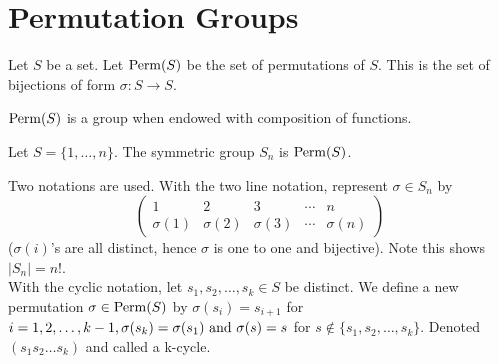 \section{Permutation Groups}

\begin{definition}[Permutations]
    Let \(S\) be a set. Let \(\operatorname{Perm}(S)\) be the set of permutations of \(S\). This is the set of bijections of form \(\sigma: S \to S\).
\end{definition}

\begin{proposition}
    \(\operatorname{Perm}(S)\) is a group when endowed with composition of functions.
\end{proposition}

\begin{definition}
    Let \(S = \{1, \dots, n\}\). The symmetric group \(S_n\) is \(\operatorname{Perm}(S)\).
\end{definition}

Two notations are used. With the two line notation, represent \(\sigma \in S_n\) by
\[\begin{pmatrix}
        1         & 2         & 3         & \cdots & n         \\
        \sigma(1) & \sigma(2) & \sigma(3) & \cdots & \sigma(n)
    \end{pmatrix}\]
(\(\sigma(i)\)'s are all distinct, hence \(\sigma\) is one to one and bijective). Note this shows \(|S_n| = n!\). \\

With the cyclic notation, let \(s_1, s_2, \dots, s_k \in S\) be distinct. We define a new permutation \(\sigma \in \operatorname{Perm}(S)\) by \(\sigma(s_i) = s_{i + 1}\) for \(i = 1, 2, \dots, k - 1, \sigma(s_k) = \sigma(s_1) \text{ and } \sigma(s) = s\) for \(s \notin \{s_1, s_2, \dots, s_k\}\). Denoted \((s_1 s_2 \dots s_k)\) and called a k-cycle.


